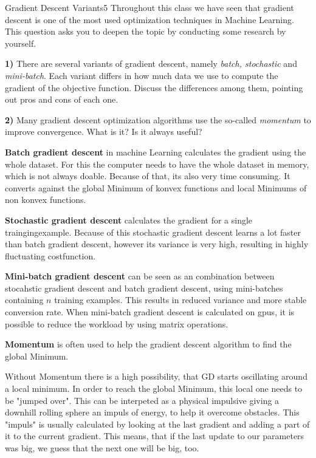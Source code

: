 \begin{questions}

\begin{question}{Gradient Descent Variants}{5}
Throughout this class we have seen that gradient descent is one of the most used optimization techniques in Machine Learning. This question asks you to deepen the topic by conducting some research by yourself.

\textbf{1)} There are several variants of gradient descent, namely \emph{batch, stochastic} and \emph{mini-batch}. Each variant differs in how much data we use to compute the gradient of the objective function. 
Discuss the differences among them, pointing out pros and cons of each one.

\textbf{2)} Many gradient descent optimization algorithms use the so-called \emph{momentum} to improve convergence. What is it? Is it always useful?

\begin{answer}



\textbf{Batch gradient descent} in machine Learning calculates the gradient using the whole dataset. For this the computer needs to have the whole dataset in memory, which is not always doable. Because of that, its also very time consuming. It converts against the global Minimum of konvex functions and local Minimums of non konvex functions.

\textbf{Stochastic gradient descent} calculates the gradient for a single traingingexample. Because of this stochastic gradient descent learns a lot faster than batch gradient descent, however its variance is very high, resulting in highly fluctuating costfunction.


\textbf{Mini-batch gradient descent} can be seen as an combination between stocahstic gradient descent and batch gradient descent, using mini-batches containing $n$ training examples. This results in reduced variance and more stable conversion rate. When mini-batch gradient descent is calculated on gpus, it is possible to reduce the workload by using matrix operations.


\textbf{Momentum} is often used to help the gradient descent algorithm to find the global Minimum. 

Without Momentum there is a high possibility, that GD starts oscillating around a local minimum. In order to reach the global Minimum, this local one needs to be "jumped over". This can be interpeted as a physical impulsive giving a downhill rolling sphere an impuls of energy, to help it overcome obstacles. This "impuls" is usually calculated by looking at the last gradient and adding a part of it to the current gradient. This means, that if the last update to our parameters was big, we guess that the next one will be big, too.
\end{answer}


\end{question}
\end{questions}
